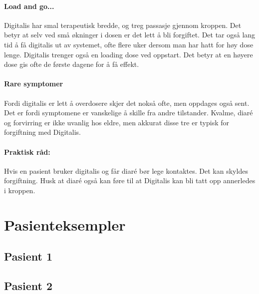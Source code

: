 				\paragraph{Load and go...\\}
					Digitalis har smal terapeutisk bredde, og treg passasje gjennom kroppen. Det betyr at selv ved små økninger i dosen er det lett å bli forgiftet. Det tar også lang tid å få digitalis ut av systemet, ofte flere uker dersom man har hatt for høy dose lenge. Digitalis trenger også en loading dose ved oppstart. Det betyr at en høyere dose gis ofte de første dagene for å få effekt.
				\paragraph{Rare symptomer\\}
					Fordi digitalis er lett å overdosere skjer det nokså ofte, men oppdages også sent. Det er fordi symptomene er vanskelige å skille fra andre tilstander. Kvalme, diaré og forvirring er ikke uvanlig hos eldre, men akkurat disse tre er typisk for forgiftning med Digitalis.
				\paragraph{Praktisk råd:\\}
					Hvis en pasient bruker digitalis og får diaré bør lege kontaktes. Det kan skyldes forgiftning. Husk at diaré også kan føre til at Digitalis kan bli tatt opp annerledes i kroppen.
		\section{Pasienteksempler}
			\subsection{Pasient 1}
			\subsection{Pasient 2}

\newpage